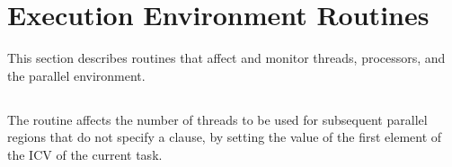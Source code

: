 %
%
%
%
%
%
%
%
%
%
%
%
%


\section{Execution Environment Routines}
\label{sec:Execution Environment Routines}
This section describes routines that affect and monitor threads, 
processors, and the parallel environment.



\subsection{}
\label{subsec:omp_set_num_threads}
\summary
The  routine affects the number of threads 
to be used for subsequent parallel regions that do not specify a 
 clause, by setting the value of the first element 
of the  ICV of the current task.

